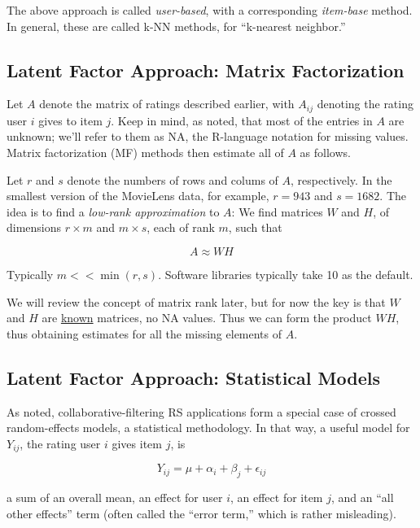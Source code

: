 The above approach is called \textit{user-based}, with a corresponding
\textit{item-base} method.  In general, these are called k-NN methods,
for ``k-nearest neighbor.''

\subsection{Latent Factor Approach:  Matrix Factorization}
\label{mf}

Let $A$ denote the matrix of ratings described earlier, with $A_{ij}$
denoting the rating user $i$ gives to item $j$.  Keep in mind, as noted,
that most of the entries in $A$ are unknown; we'll refer to them as NA,
the R-language notation for missing values.  Matrix factorization (MF)
methods then estimate all of $A$ as follows.

Let $r$ and $s$ denote the numbers of rows and colums of $A$,
respectively.  In the smallest version of the MovieLens data, for
example, $r = 943$ and $s = 1682$.  The idea is to find a
\textit{low-rank approximation} to $A$:  We find matrices $W$ and $H$,
of dimensions $r \times m$ and $m \times s$, each of rank $m$, such that 

\begin{equation}
A \approx WH
\end{equation}

Typically $m << \min(r,s)$.  Software libraries typically take 10 as the
default.

We will review the concept of matrix rank later, but for now the key is
that $W$ and $H$ are \underline{known} matrices, no NA values.  Thus we
can form the product $WH$, thus obtaining estimates for all the missing
elements of $A$.

\subsection{Latent Factor Approach: Statistical Models}

As noted, collaborative-filtering RS applications form a special case of
crossed random-effects models, a statistical methodology.  In that way,
a useful model for $Y_{ij}$, the rating user $i$ gives item $j$, is

\begin{equation}
Y_{ij} = \mu + \alpha_i + \beta_j + \epsilon_{ij}
\end{equation}

a sum of an overall mean, an effect for user $i$, an effect for item
$j$, and an ``all other effects'' term (often called the ``error term,''
which is rather misleading).  

